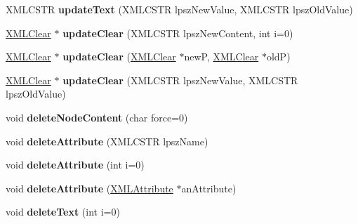 \begin{DoxyCompactItemize}
\item 
\hypertarget{struct_x_m_l_node_a476a872fa595ea8416d2991ce3bea7a6}{}\label{struct_x_m_l_node_a476a872fa595ea8416d2991ce3bea7a6} 
X\+M\+L\+C\+S\+TR {\bfseries update\+Text} (X\+M\+L\+C\+S\+TR lpsz\+New\+Value, X\+M\+L\+C\+S\+TR lpsz\+Old\+Value)
\item 
\hypertarget{struct_x_m_l_node_a6b48e123943ea53272f6d4be33ca6d04}{}\label{struct_x_m_l_node_a6b48e123943ea53272f6d4be33ca6d04} 
\hyperlink{struct_x_m_l_clear}{X\+M\+L\+Clear} $\ast$ {\bfseries update\+Clear} (X\+M\+L\+C\+S\+TR lpsz\+New\+Content, int i=0)
\item 
\hypertarget{struct_x_m_l_node_a02e1a7e3f9c48e05fad77abda2116375}{}\label{struct_x_m_l_node_a02e1a7e3f9c48e05fad77abda2116375} 
\hyperlink{struct_x_m_l_clear}{X\+M\+L\+Clear} $\ast$ {\bfseries update\+Clear} (\hyperlink{struct_x_m_l_clear}{X\+M\+L\+Clear} $\ast$newP, \hyperlink{struct_x_m_l_clear}{X\+M\+L\+Clear} $\ast$oldP)
\item 
\hypertarget{struct_x_m_l_node_a690b140b6d86776f3a257a42ce7d4948}{}\label{struct_x_m_l_node_a690b140b6d86776f3a257a42ce7d4948} 
\hyperlink{struct_x_m_l_clear}{X\+M\+L\+Clear} $\ast$ {\bfseries update\+Clear} (X\+M\+L\+C\+S\+TR lpsz\+New\+Value, X\+M\+L\+C\+S\+TR lpsz\+Old\+Value)
\item 
\hypertarget{struct_x_m_l_node_abbb236ca1081f145a04bce9ea03c62a6}{}\label{struct_x_m_l_node_abbb236ca1081f145a04bce9ea03c62a6} 
void {\bfseries delete\+Node\+Content} (char force=0)
\item 
\hypertarget{struct_x_m_l_node_a2b21339e5b370f1d7ebde2dc51217eed}{}\label{struct_x_m_l_node_a2b21339e5b370f1d7ebde2dc51217eed} 
void {\bfseries delete\+Attribute} (X\+M\+L\+C\+S\+TR lpsz\+Name)
\item 
\hypertarget{struct_x_m_l_node_a61b2405305063594b35b309cc2e22c01}{}\label{struct_x_m_l_node_a61b2405305063594b35b309cc2e22c01} 
void {\bfseries delete\+Attribute} (int i=0)
\item 
\hypertarget{struct_x_m_l_node_a6f00d7c1b4eaa29cfdd9d4a709495aca}{}\label{struct_x_m_l_node_a6f00d7c1b4eaa29cfdd9d4a709495aca} 
void {\bfseries delete\+Attribute} (\hyperlink{struct_x_m_l_attribute}{X\+M\+L\+Attribute} $\ast$an\+Attribute)
\item 
\hypertarget{struct_x_m_l_node_a14a49a23735ea10a44864cb6b4302250}{}\label{struct_x_m_l_node_a14a49a23735ea10a44864cb6b4302250} 
void {\bfseries delete\+Text} (int i=0)
\item 
\hypertarget{struct_x_m_l_node_a21ee499630d71ab6026753a85f02f582}{}\label{struct_x_m_l_node_a21ee499630d71ab6026753a85f02f582} 

\end{DoxyCompactItemize}
